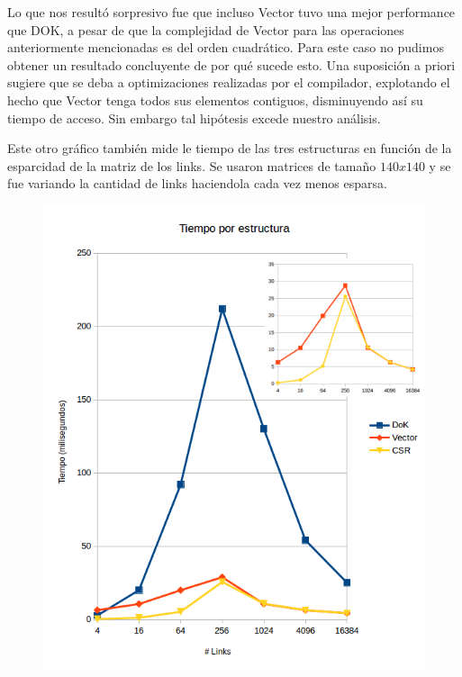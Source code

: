 Lo que nos resultó sorpresivo fue que incluso Vector tuvo una mejor performance que DOK, a pesar de que la complejidad de Vector para las operaciones anteriormente mencionadas es del orden cuadrático. Para este caso no pudimos obtener un resultado concluyente de por qué sucede esto. Una suposición a priori sugiere que se deba a optimizaciones realizadas por el compilador, explotando el hecho que Vector tenga todos sus elementos contiguos, disminuyendo así su tiempo de acceso. Sin embargo tal hipótesis excede nuestro análisis.\\
\newpage

Este otro gráfico también mide le tiempo de las tres estructuras en función de la esparcidad de la matriz de los links. Se usaron matrices de tamaño $140x140$ y se fue variando la cantidad de links haciendola cada vez menos esparsa.\\

\begin{figure}
  \vspace{-20pt}
  \begin{center}
    \includegraphics[scale=0.4]{imagenes/MedicionTiempoEstructura.png}
  \end{center}
  \vspace{-20pt}
  \vspace{-10pt}
  \label{fig:img1}
\end{figure}


